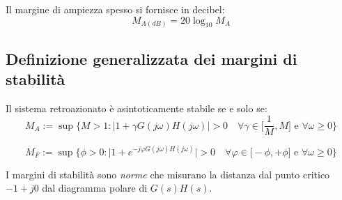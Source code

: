 Il margine di ampiezza spesso si fornisce in decibel:
\begin{equation}
  M_{A(dB)} = 20\log_{10} M_A
\end{equation}

\subsection{Definizione generalizzata dei margini di stabilità}
Il sistema retroazionato è asintoticamente stabile se e solo se:
\begin{equation}
  M_A := \sup \Big\{ M > 1: \Big|1 + \gamma G(j\omega)H(j\omega)\Big| > 0 \quad \forall \gamma \in \Big[ \frac{1}{M}, M \Big] \text{ e } \forall \omega \geq 0 \Big\}
\end{equation}

\begin{equation}
  M_F := \sup \Big\{ \phi > 0: \Big|1 + e^{-j \varphi G(j\omega)H(j\omega)} \Big| > 0 \quad \forall \varphi \in \Big[ - \phi, +\phi \Big] \text{ e } \forall \omega \geq 0 \Big\}
\end{equation}



I margini di stabilità sono \textit{norme} che misurano la distanza dal punto 
critico $-1 + j0$ dal diagramma polare di $G(s)H(s)$.


